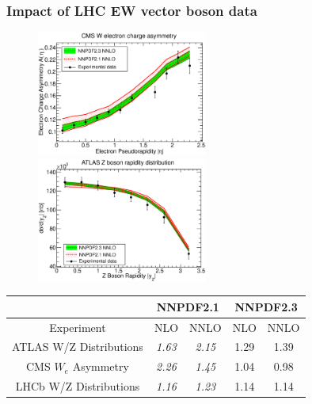 \documentclass[10pt]{beamer}
\begin{document}
\begin{frame}
\frametitle{Impact of LHC EW vector boson data}
 \begin{figure}[b!]
    \begin{center}
      \includegraphics[width=0.50\textwidth]{CMSWEASY840PB_0.eps}
      \includegraphics[width=0.50\textwidth]{ATLASWZRAP36PB_2.eps}
    \end{center}
    \vskip-0.5cm
    \label{fig:pdf-jets}
\end{figure}

\begin{table}
\small
\begin{tabular}{|c||c|c||c|c|}
\hline 
& \multicolumn{2}{c||}{\bf NNPDF2.1} & \multicolumn{2}{|c|}{\bf NNPDF2.3}  \\
\hline 
\hline 
Experiment  & NLO & NNLO  & NLO  & NNLO  \\
\hline
ATLAS W/Z Distributions & {\it 1.63} & {\it 2.15}  & 1.29  &  1.39   \\
CMS $W_e$ Asymmetry  & {\it 2.26} & {\it 1.45}  & 1.04 & 0.98   \\
LHCb W/Z Distributions & {\it 1.16} &  {\it 1.23} & 1.14  & 1.14   \\
\hline
\end{tabular}
\end{table}


\end{frame}
\end{document}
